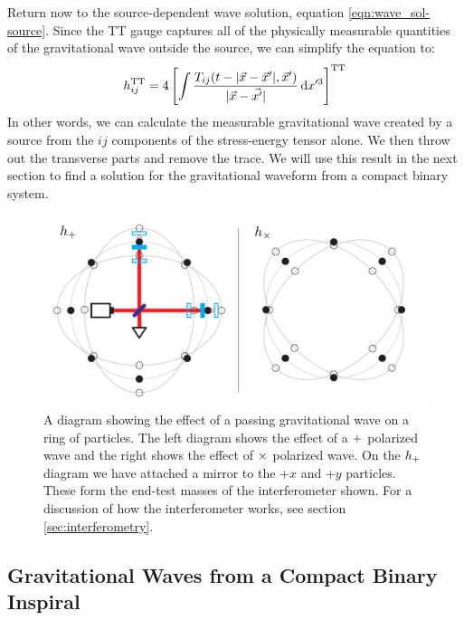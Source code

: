 Return now to the source-dependent wave solution, equation \ref{eqn:wave_sol-source}. Since the TT gauge captures all of the physically measurable quantities of the gravitational wave outside the source, we can simplify the equation to:
\begin{equation}
\label{eqn:wave_from_source}
h^\TT_{ij} = 4 \left[\int \frac{ T_{ij}(t - |\vec{x}-\vec{x}'|, \vec{x}')}{|\vec{x} - \vec{x'}|} \d x'^3\right]^\TT
\end{equation}
In other words, we can calculate the measurable gravitational wave created by a source from the $ij$ components of the stress-energy tensor alone. We then throw out the transverse parts and remove the trace. We will use this result in the next section to find a solution for the gravitational waveform from a compact binary system.

\begin{figure}[htb]
\center
\includegraphics[width=6in]{figures/hpls-hcrs.pdf}
\caption{A diagram showing the effect of a passing gravitational wave on a ring of particles. The left diagram shows the effect of a $+$ polarized wave and the right shows the effect of $\times$ polarized wave. On the $h_{+}$ diagram we have attached a mirror to the $+x$ and $+y$ particles. These form the end-test masses of the interferometer shown. For a discussion of how the interferometer works, see section \ref{sec:interferometry}.}
\label{fig:hpls-hcrs}
\end{figure}

\subsection{Gravitational Waves from a Compact Binary Inspiral}

